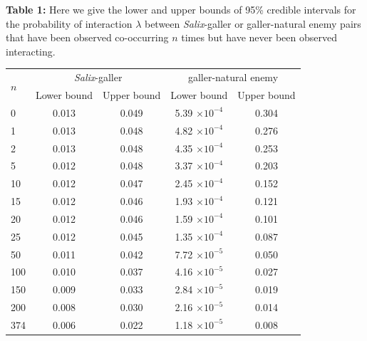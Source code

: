 \documentclass[12pt]{article}
\begin{document}
\begin{fullbox}{}
\begin{spacing}{1.0}
      \medskip
        \textbf{Table 1:} Here we give the lower and upper bounds of 95\% credible intervals for the probability of interaction $\lambda$ between \emph{Salix}-galler or galler-natural enemy pairs that have been observed co-occurring $n$ times but have never been observed interacting.\\
        \begin{tabular}{l  c c  c c }
        \multirow{2}{*}{$n$} & \multicolumn{2}{c}{\emph{Salix}-galler} & \multicolumn{2}{c}{galler-natural enemy}\\
         & Lower bound & Upper bound & Lower bound & Upper bound \\
        \hline
        0   & 0.013 & 0.049 & 5.39 $\times10^{-4}$ & 0.304 \\
        1   & 0.013 & 0.048 & 4.82 $\times10^{-4}$ & 0.276 \\
        2   & 0.013 & 0.048 & 4.35 $\times10^{-4}$ & 0.253 \\
        5   & 0.012 & 0.048 & 3.37 $\times10^{-4}$ & 0.203 \\
        10  & 0.012 & 0.047 & 2.45 $\times10^{-4}$ & 0.152 \\
        15  & 0.012 & 0.046 & 1.93 $\times10^{-4}$ & 0.121 \\
        20  & 0.012 & 0.046 & 1.59 $\times10^{-4}$ & 0.101 \\
        25  & 0.012 & 0.045 & 1.35 $\times10^{-4}$ & 0.087 \\
        50  & 0.011 & 0.042 & 7.72 $\times10^{-5}$ & 0.050 \\
        100 & 0.010 & 0.037 & 4.16 $\times10^{-5}$ & 0.027 \\
        150 & 0.009 & 0.033 & 2.84 $\times10^{-5}$ & 0.019 \\
        200 & 0.008 & 0.030 & 2.16 $\times10^{-5}$ & 0.014 \\
        \hline
        374 & 0.006 & 0.022 & 1.18 $\times10^{-5}$ & 0.008 \\
        \hline
        \end{tabular}
    \end{spacing}
\end{fullbox}
\end{document}

